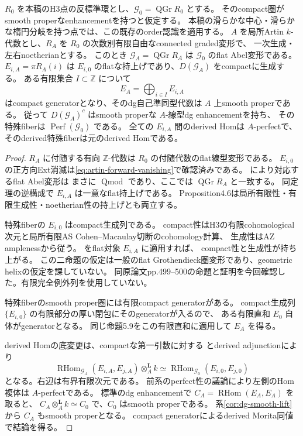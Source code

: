 \begin{theorem}[平坦な切断環のqgrのenhancement]\label{thm:flat-qgr-enhancement}
$R_0$ を本稿のH3点の反標準環とし、$\mathcal G_0=\operatorname{QGr}R_0$ とする。
そのcompact圏がsmooth properなenhancementを持つと仮定する。
本稿の滑らかな中心・滑らかな楕円分岐を持つ点では、この既存のorder認識を適用する。
$A$ を局所Artin $k$-代数とし、$R_A$ を $R_0$ の次数別有限自由なconnected graded変形で、
一次生成・左右noetherianとする。
このとき $\mathcal G_A=\operatorname{QGr}R_A$ は $\mathcal G_0$ のflat Abel変形である。
$E_{i,A}=\pi R_A(i)$ は $E_{i,0}$ のflatな持上げであり、$D(\mathcal G_A)$ をcompactに生成する。
ある有限集合 $I\subset\mathbb Z$ について
\[
 E_A=\bigoplus_{i\in I}E_{i,A}
\]
はcompact generatorとなり、そのdg自己準同型代数は $A$ 上smooth properである。
従って $D(\mathcal G_A)^c$ はsmooth properな $A$-線型dg enhancementを持ち、
その特殊fiberは $\operatorname{Perf}(\mathcal G_0)$ である。
全ての $E_{i,A}$ 間のderived Homは $A$-perfectで、そのderived特殊fiberは元のderived Homである。
\end{theorem}
\begin{proof}
$R_A$ に付随する有向 $\mathbb Z$-代数は $R_0$ の付随代数のflat線型変形である。
$E_{i,0}$ の正方向Ext消滅は\eqref{eq:artin-forward-vanishing}で確認済みである。
\cite[Proposition4.4, Theorem4.5]{DeDekenLowen}により対応するflat Abel変形は
まさに $\operatorname{Qmod}$ であり、ここでは $\operatorname{QGr}R_A$ と一致する。
同定理の逆構成で $E_{i,A}$ は一意なflat持上げである。
Proposition4.6は局所有限性・有限生成性・noetherian性の持上げとも両立する。

特殊fiberの $E_{i,0}$ はcompact生成列である。
compact性はH3の有限cohomological次元と局所有限AS Cohen--Macaulay切断のcohomology計算、
生成性はAZ amplenessから従う。
\cite[Propositions5.8,5.9]{DeDekenLowen}をflat対象 $E_{i,A}$ に適用すれば、
compact性と生成性が持ち上がる。
この二命題の仮定は一般のflat Grothendieck圏変形であり、geometric helixの仮定を課していない。
同原論文pp.499--500の命題と証明を今回確認した。有限完全例外列を使用していない。

特殊fiberのsmooth proper圏には有限compact generatorがある。
compact生成列 $\{E_{i,0}\}$ の有限部分の厚い閉包にそのgeneratorが入るので、
ある有限直和 $E_0$ 自体がgeneratorとなる。
同じ命題5.9をこの有限直和に適用して $E_A$ を得る。

derived Homの底変更は、compactな第一引数に対する
\cite[Proposition5.5]{DeDekenLowen}とderived adjunctionにより
\[
 \operatorname{RHom}_{\mathcal G_A}(E_{i,A},E_{j,A})
       \otimes_A^{\mathbf L}k
 \simeq
 \operatorname{RHom}_{\mathcal G_0}(E_{i,0},E_{j,0})
\]
となる。右辺は有界有限次元である。
前系のperfect性の議論により左側のHom複体は $A$-perfectである。
標準のdg enhancementで $C_A=\operatorname{RHom}(E_A,E_A)$ を取ると、
$C_A\otimes_A^{\mathbf L}k\simeq C_0$ で、$C_0$ はsmooth properである。
系\ref{cor:dg-smooth-lift}から $C_A$ もsmooth properとなる。
compact generatorによるderived Morita同値で結論を得る。
\end{proof}

